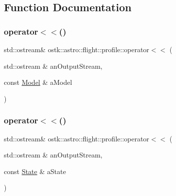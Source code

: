 \subsection{Function Documentation}
\mbox{\label{namespaceostk_1_1astro_1_1flight_1_1profile_a71513e36c79ebe7508be4aedb67d6a50}} 
\subsubsection{\texorpdfstring{operator$<$$<$()}{operator<<()}\hspace{0.1cm}{\footnotesize\ttfamily [1/2]}}
{\footnotesize\ttfamily std\+::ostream\& ostk\+::astro\+::flight\+::profile\+::operator$<$$<$ (\begin{DoxyParamCaption}\item[{std\+::ostream \&}]{an\+Output\+Stream,  }\item[{const \hyperlink{classostk_1_1astro_1_1flight_1_1profile_1_1_model}{Model} \&}]{a\+Model }\end{DoxyParamCaption})}

\mbox{\label{namespaceostk_1_1astro_1_1flight_1_1profile_ac541dd34ecd497de53634c897e4f5a07}} 
\subsubsection{\texorpdfstring{operator$<$$<$()}{operator<<()}\hspace{0.1cm}{\footnotesize\ttfamily [2/2]}}
{\footnotesize\ttfamily std\+::ostream\& ostk\+::astro\+::flight\+::profile\+::operator$<$$<$ (\begin{DoxyParamCaption}\item[{std\+::ostream \&}]{an\+Output\+Stream,  }\item[{const \hyperlink{classostk_1_1astro_1_1flight_1_1profile_1_1_state}{State} \&}]{a\+State }\end{DoxyParamCaption})}

